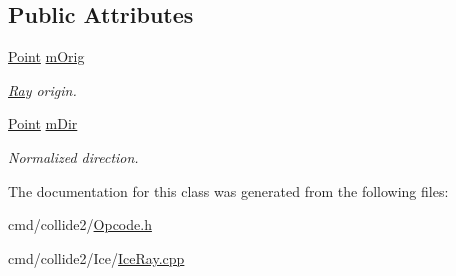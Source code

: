 \subsection*{Public Attributes}
\begin{DoxyCompactItemize}
\item 
\hyperlink{classOpcode_1_1Point}{Point} \hyperlink{classOpcode_1_1Ray_a1221eca7854a5c368ab6c447a2f448ec}{m\+Orig}\hypertarget{classOpcode_1_1Ray_a1221eca7854a5c368ab6c447a2f448ec}{}\label{classOpcode_1_1Ray_a1221eca7854a5c368ab6c447a2f448ec}

\begin{DoxyCompactList}\small\item\em \hyperlink{classOpcode_1_1Ray}{Ray} origin. \end{DoxyCompactList}\item 
\hyperlink{classOpcode_1_1Point}{Point} \hyperlink{classOpcode_1_1Ray_a4d6d10a8cc6346525ff4bd27cdffcb20}{m\+Dir}\hypertarget{classOpcode_1_1Ray_a4d6d10a8cc6346525ff4bd27cdffcb20}{}\label{classOpcode_1_1Ray_a4d6d10a8cc6346525ff4bd27cdffcb20}

\begin{DoxyCompactList}\small\item\em Normalized direction. \end{DoxyCompactList}\end{DoxyCompactItemize}


The documentation for this class was generated from the following files\+:\begin{DoxyCompactItemize}
\item 
cmd/collide2/\hyperlink{Opcode_8h}{Opcode.\+h}\item 
cmd/collide2/\+Ice/\hyperlink{IceRay_8cpp}{Ice\+Ray.\+cpp}\end{DoxyCompactItemize}
